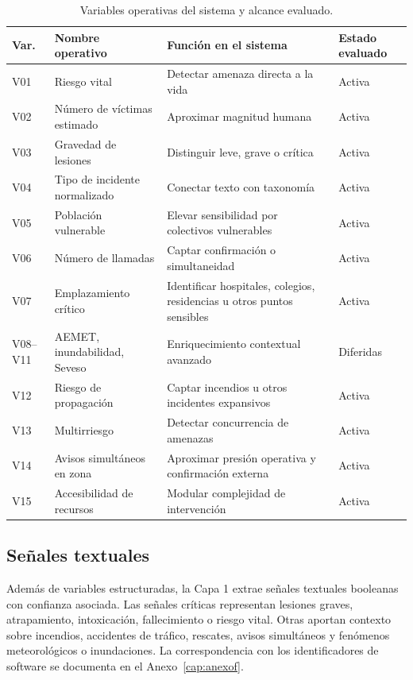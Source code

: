 \begin{table}[htbp]
\centering
\scriptsize
\begin{tabular}{|p{1.1cm}|p{4.4cm}|p{4.1cm}|p{3.5cm}|}
\hline
\textbf{Var.} & \textbf{Nombre operativo} & \textbf{Función en el sistema} & \textbf{Estado evaluado} \\ \hline
V01 & Riesgo vital & Detectar amenaza directa a la vida & Activa \\ \hline
V02 & Número de víctimas estimado & Aproximar magnitud humana & Activa \\ \hline
V03 & Gravedad de lesiones & Distinguir leve, grave o crítica & Activa \\ \hline
V04 & Tipo de incidente normalizado & Conectar texto con taxonomía & Activa \\ \hline
V05 & Población vulnerable & Elevar sensibilidad por colectivos vulnerables & Activa \\ \hline
V06 & Número de llamadas & Captar confirmación o simultaneidad & Activa \\ \hline
V07 & Emplazamiento crítico & Identificar hospitales, colegios, residencias u otros puntos sensibles & Activa \\ \hline
V08--V11 & AEMET, inundabilidad, Seveso & Enriquecimiento contextual avanzado & Diferidas \\ \hline
V12 & Riesgo de propagación & Captar incendios u otros incidentes expansivos & Activa \\ \hline
V13 & Multirriesgo & Detectar concurrencia de amenazas & Activa \\ \hline
V14 & Avisos simultáneos en zona & Aproximar presión operativa y confirmación externa & Activa \\ \hline
V15 & Accesibilidad de recursos & Modular complejidad de intervención & Activa \\ \hline
\end{tabular}
\caption{Variables operativas del sistema y alcance evaluado.}
\label{tab:variables-cap6}
\end{table}

\subsection{Señales textuales}

Además de variables estructuradas, la Capa 1 extrae señales textuales booleanas con confianza asociada. Las señales críticas representan lesiones graves, atrapamiento, intoxicación, fallecimiento o riesgo vital. Otras aportan contexto sobre incendios, accidentes de tráfico, rescates, avisos simultáneos y fenómenos meteorológicos o inundaciones. La correspondencia con los identificadores de software se documenta en el Anexo~\ref{cap:anexof}.

